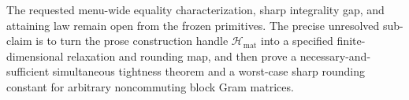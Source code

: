 The requested menu-wide equality characterization, sharp integrality gap, and attaining law remain open from the frozen primitives.  The precise unresolved sub-claim is to turn the prose construction handle \(\mathcal H_{\mathrm{mat}}\) into a specified finite-dimensional relaxation and rounding map, and then prove a necessary-and-sufficient simultaneous tightness theorem and a worst-case sharp rounding constant for arbitrary noncommuting block Gram matrices.